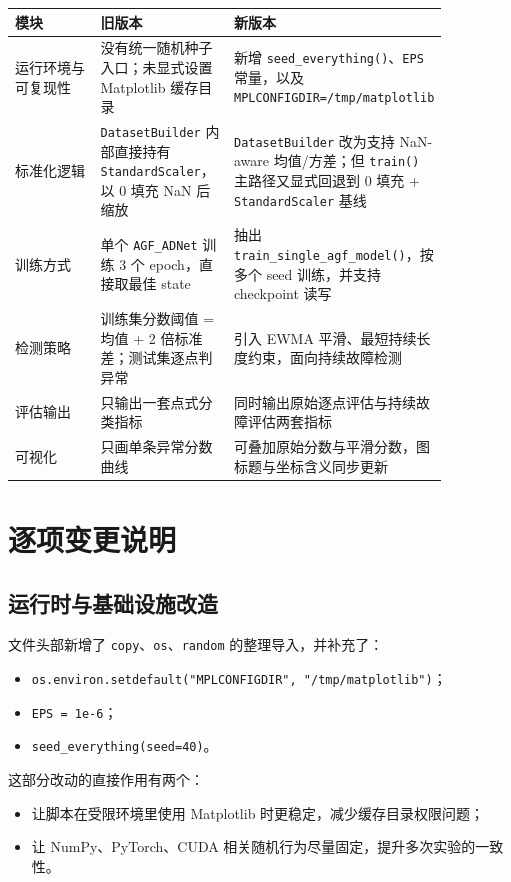 \documentclass[UTF8]{ctexart}
\begin{document}
\begin{longtable}{>{\raggedright\arraybackslash}p{0.22\linewidth} >{\raggedright\arraybackslash}p{0.31\linewidth} >{\raggedright\arraybackslash}p{0.33\linewidth}}
\toprule
模块 & 旧版本 & 新版本 \\
\midrule
\endhead
运行环境与可复现性 & 没有统一随机种子入口；未显式设置 Matplotlib 缓存目录 & 新增 \texttt{seed\_everything()}、\texttt{EPS} 常量，以及 \texttt{MPLCONFIGDIR=/tmp/matplotlib} \\
标准化逻辑 & \texttt{DatasetBuilder} 内部直接持有 \texttt{StandardScaler}，以 0 填充 NaN 后缩放 & \texttt{DatasetBuilder} 改为支持 NaN-aware 均值/方差；但 \texttt{train()} 主路径又显式回退到 0 填充 + \texttt{StandardScaler} 基线 \\
训练方式 & 单个 \texttt{AGF\_ADNet} 训练 3 个 epoch，直接取最佳 state & 抽出 \texttt{train\_single\_agf\_model()}，按多个 seed 训练，并支持 checkpoint 读写 \\
检测策略 & 训练集分数阈值 = 均值 + 2 倍标准差；测试集逐点判异常 & 引入 EWMA 平滑、最短持续长度约束，面向持续故障检测 \\
评估输出 & 只输出一套点式分类指标 & 同时输出原始逐点评估与持续故障评估两套指标 \\
可视化 & 只画单条异常分数曲线 & 可叠加原始分数与平滑分数，图标题与坐标含义同步更新 \\
\bottomrule
\end{longtable}

\section{逐项变更说明}

\subsection{运行时与基础设施改造}

文件头部新增了 \texttt{copy}、\texttt{os}、\texttt{random} 的整理导入，并补充了：
\begin{itemize}
    \item \texttt{os.environ.setdefault("MPLCONFIGDIR", "/tmp/matplotlib")}；
    \item \texttt{EPS = 1e-6}；
    \item \texttt{seed\_everything(seed=40)}。
\end{itemize}

这部分改动的直接作用有两个：
\begin{itemize}
    \item 让脚本在受限环境里使用 Matplotlib 时更稳定，减少缓存目录权限问题；
    \item 让 NumPy、PyTorch、CUDA 相关随机行为尽量固定，提升多次实验的一致性。
\end{itemize}
\end{document}
